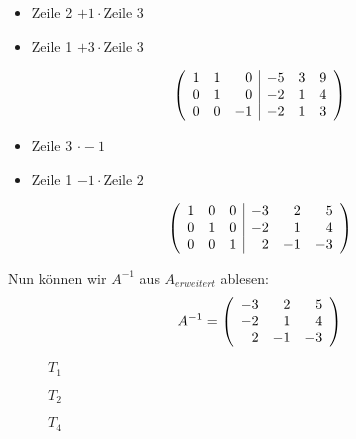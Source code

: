 \documentclass[12pt]{article}
\begin{document}
\begin{itemize}
\item Zeile 2 $ + 1 \cdot \text{Zeile } 3$
\item Zeile 1 $ + 3 \cdot \text{Zeile } 3$
\end{itemize}

$$
\left(
	\begin{array}{r r r | r r r}
		1	 &	 1	&	 0	&	-5	&	3	&	9	\\
		0	 &	 1	&	 0	&	-2	&	1 &	4	\\
		0	 &	 0	&	-1	&	-2	&	1	&	3	\\
	\end{array}
\right )
$$

\begin{itemize}
\item Zeile 3 $ \cdot -1$
\item Zeile 1 $ - 1 \cdot \text{Zeile } 2$
\end{itemize}

$$
\left(
	\begin{array}{r r r | r r r}
		1	 &	 0	&	 0	&	-3	&	 2	&	 5	\\
		0	 &	 1	&	 0	&	-2	&	 1  &	 4	\\
		0	 &	 0	&	 1	&	 2	&	-1	&	-3	\\
	\end{array}
\right )
$$

Nun können wir $A^{-1}$ aus $A_{erweitert}$ ablesen:
$$
A^{-1} = \left(
	\begin{array}{r r r}
			-3	&	 2	&	 5	\\
			-2	&	 1  &	 4	\\
		   2	&	-1	&	-3	\\
	\end{array}
\right )
$$

\begin{figure}[h]
	\centering
	\scalebox{.5}{}
	\caption{$T_1$} 
	\label{img:baum1}
\end{figure}


\begin{figure}[h]
	\centering
	\scalebox{.5}{}
	\caption{$T_2$} 
	\label{img:baum2}
\end{figure} 



\begin{figure}[h]
	\centering
	\scalebox{.5}{}
	\caption{$T_4$} 
	\label{img:baum4}
\end{figure}
\end{document}
